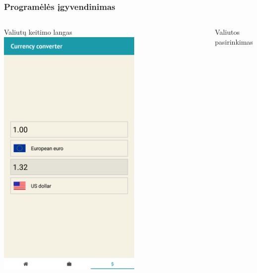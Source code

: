 \documentclass[hyperref={breaklinks=true},fleqn,mathserif]{beamer}
\begin{document}
	\begin{frame}
		\frametitle{Programėlės įgyvendinimas}
		\begin{columns}
			\begin{column}{.48\textwidth}
				\begin{block}{Valiutų keitimo langas}
					\includegraphics[width=0.65\textwidth]{Pav/currency.png}\centering
				\end{block}
			\end{column}
			\begin{column}{.48\textwidth}
				\begin{block}{Valiutos pasirinkimas}

\end{block}
\end{column}
\end{columns}
\end{frame}
\end{document}
